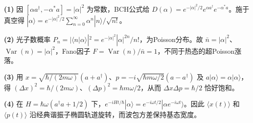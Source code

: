 \par\noindent\textbf{(1)} 因 \([\alpha a^\dagger,-\alpha^*a]=|\alpha|^2\) 为常数，BCH公式给 \(D(\alpha)=e^{-|\alpha|^2/2}e^{\alpha a^\dagger}e^{-\alpha^*a}\)。施于真空得 \(|\alpha\rangle=e^{-|\alpha|^2/2}\sum_{n=0}^\infty\alpha^n|n\rangle/\sqrt{n!}\)。
\par\noindent\textbf{(2)} 光子数概率 \(P_n=|\langle n|\alpha\rangle|^2=e^{-|\alpha|^2}|\alpha|^{2n}/n!\)，为Poisson分布。故 \(\bar n=|\alpha|^2\)、\(\operatorname{Var}(n)=|\alpha|^2\)，Fano因子 \(F=\operatorname{Var}(n)/\bar n=1\)，不同于热态的超Poisson涨落。
\par\noindent\textbf{(3)} 用 \(x=\sqrt{\hbar/(2m\omega)}(a+a^\dagger)\)、\(p=-i\sqrt{\hbar m\omega/2}(a-a^\dagger)\) 及 \(a|\alpha\rangle=\alpha|\alpha\rangle\)，得 \((\Delta x)^2=\hbar/(2m\omega)\)、\((\Delta p)^2=\hbar m\omega/2\)，从而 \(\Delta x\Delta p=\hbar/2\) 恰好饱和。
\par\noindent\textbf{(4)} 在 \(H=\hbar\omega(a^\dagger a+1/2)\) 下，\(e^{-iHt/\hbar}|\alpha\rangle=e^{-i\omega t/2}|\alpha e^{-i\omega t}\rangle\)。因此 \(\langle x(t)\rangle\) 和 \(\langle p(t)\rangle\) 沿经典谐振子椭圆轨道旋转，而波包方差保持基态宽度。
